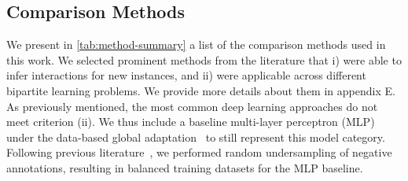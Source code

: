 \documentclass[letterpaper]{article}
\begin{document}
\subsection{Comparison Methods}
\label{sec:baselines}


We present in \cref{tab:method-summary} a list of the comparison methods used in this work. We selected prominent methods from the literature that i) were able to infer interactions for new instances, and ii) were applicable across different bipartite learning problems. We provide more details about them in
appendix E.
As previously mentioned, the most common deep learning approaches do not meet criterion (ii). We thus include a baseline multi-layer perceptron (MLP)~\cite{hinton1990connectionist} under the data-based global adaptation~\cite{schrynemackers_protocols_2013} to still represent this model category. Following previous literature~\cite{huang_moltrans_2020,dehghan_tripletmultidti_2023}, we performed random undersampling of negative annotations, resulting in balanced training datasets for the MLP baseline.
\end{document}
